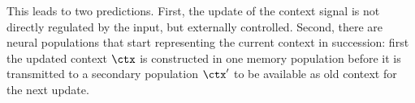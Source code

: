 This leads to two predictions.
First, the update of the context signal is not directly regulated by the input, but externally controlled.
Second, there are neural populations that start representing the current context in succession: first the updated context $\ctx$ is constructed in one memory population before it is transmitted to a secondary population $\ctx'$ to be available as old context for the next update.
